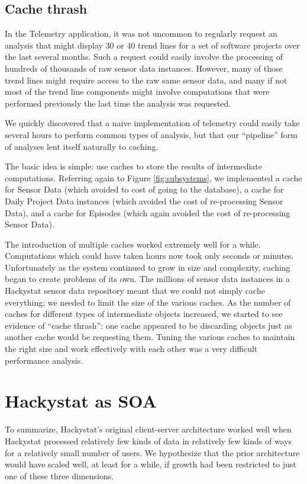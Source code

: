 \documentclass[conference,compsoc]{IEEEtran}
\begin{document}
\subsection{Cache thrash}
\label{sec:caching}

In the Telemetry application, it was not uncommon to regularly request an
analysis that might display 30 or 40 trend lines for a set of software
projects over the last several months. Such a request could easily involve
the processing of hundreds of thousands of raw sensor data
instances. However, many of those trend lines might require access to the
raw same sensor data, and many if not most of the trend line components
might involve computations that were performed previously the last time the
analysis was requested.

We quickly discovered that a naive implementation of telemetry could
easily take several hours to perform common types of analysis, but that our 
``pipeline'' form of analyses lent itself naturally to caching.

The basic idea is simple: use caches to store the results of intermediate
computations.  Referring again to Figure \ref{fig:subsystems}, we
implemented a cache for Sensor Data (which avoided to cost of going to the
database), a cache for Daily Project Data instances (which avoided the cost
of re-processing Sensor Data), and a cache for Episodes (which again
avoided the cost of re-processing Sensor Data).

The introduction of multiple caches worked extremely well for a while.
Computations which could have taken hours now took only seconds or minutes.
Unfortunately as the system continued to grow in size and complexity,
caching began to create problems of its own.  The millions of sensor data
instances in a Hackystat sensor data repository meant that we could not
simply cache everything; we needed to limit the size of the various caches.
As the number of caches for different types of intermediate objects
increased, we started to see evidence of ``cache thrash'': one cache
appeared to be discarding objects just as another cache would be requesting
them. Tuning the various caches to maintain the right size and work
effectively with each other was a very difficult performance analysis.

\section{Hackystat as SOA}
\label{sec:soa}

To summarize, Hackystat's original client-server architecture worked well
when Hackystat processed relatively few kinds of data in relatively few
kinds of ways for a relatively small number of users.  We hypothesize that
the prior architecture would have scaled well, at least for a while, if
growth had been restricted to just one of these three dimensions.
\end{document}
